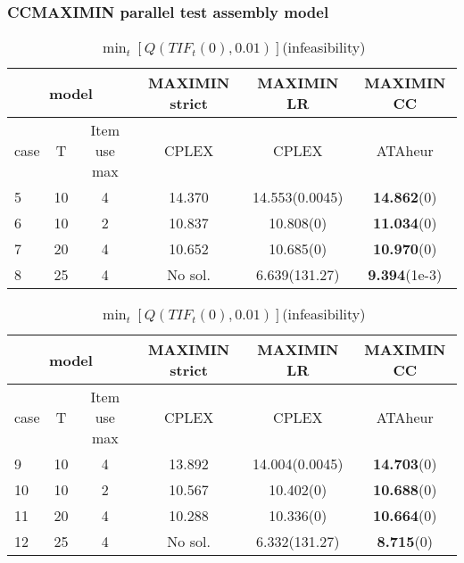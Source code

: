 \subsubsection{CCMAXIMIN parallel test assembly model}
\begin{table}[h]
	\caption{ $\min_t\left[Q(TIF_t(0),0.05)\right]$(infeasibility)} 
	\begin{tabular}{l ccc c c}
		\toprule
		\multicolumn{3}{c}{model} & MAXIMIN strict & MAXIMIN LR & MAXIMIN CC\\
		\midrule
		case & T & Item use max &CPLEX & CPLEX & ATAheur  \\
		\hline
		5& 10 & 4&  14.370 & 14.553(0.0045) & \textbf{14.862}(0)  \\
		6 &10 & 2&  10.837 & 10.808(0) & \textbf{11.034}(0) \\
		7& 20 & 4&  10.652 & 10.685(0) & \textbf{10.970}(0) \\
		8& 25 & 4&  No sol. & 6.639(131.27) &  \textbf{9.394}(1e-3) \\
		\bottomrule
	\end{tabular}
\vspace{10pt}
	\caption{ $\min_t\left[Q(TIF_t(0),0.01)\right]$(infeasibility)} 
	\begin{tabular}{l cc c c c}
		\toprule
		\multicolumn{3}{c}{model} & MAXIMIN strict & MAXIMIN LR & MAXIMIN CC\\
		\midrule
		case & T & Item use max &CPLEX & CPLEX & ATAheur  \\
		\hline
		9& 10 & 4& 13.892  & 14.004(0.0045) & \textbf{14.703}(0)  \\
		10 &10 & 2& 10.567 & 10.402(0)  & \textbf{10.688}(0) \\
		11& 20 & 4& 10.288  & 10.336(0) & \textbf{10.664}(0) \\
		12& 25 & 4&  No sol. & 6.332(131.27) & \textbf{8.715}(0) \\
		\bottomrule
	\end{tabular}
\end{table}
%
